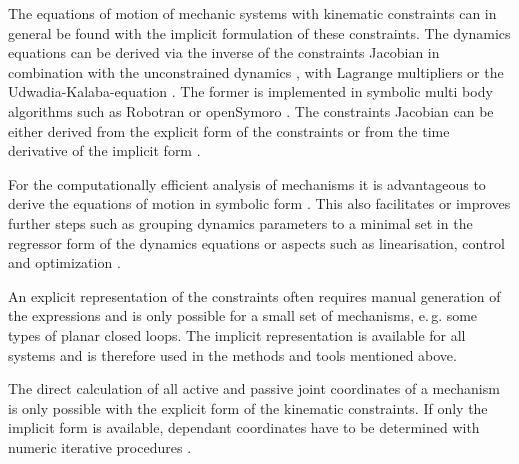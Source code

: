 \documentclass[twocolumn,10pt]{IFTOMM}
\begin{document}
The equations of motion of mechanic systems with kinematic constraints can in general be found with the implicit formulation of these constraints.
The dynamics equations can be derived via the inverse of the constraints Jacobian in combination with the unconstrained dynamics \cite{NakamuraGho1989}, with Lagrange multipliers \cite{LuhZhe1985} or the Udwadia-Kalaba-equation \cite{UdwadiaKal1992}.
The former is implemented in symbolic multi body algorithms such as Robotran \cite{SaminFis2013} or openSymoro \cite{KhalilVijKhoMuk2014}.
The constraints Jacobian can be either derived from the explicit form of the constraints \cite{NakamuraGho1989} or from the time derivative of the implicit form \cite{ParkChoPlo1999}.

For the computationally efficient analysis of mechanisms it is advantageous to derive the equations of motion in symbolic form \cite{SaminFis2013}.
This also facilitates or improves further steps such as grouping dynamics parameters to a minimal set  in the regressor form of the dynamics equations \cite{KhalilBen1995} or aspects such as linearisation, control and optimization \cite{ParkChoPlo1999}.


An explicit representation of the constraints often requires manual generation of the expressions and is only possible for a small set of mechanisms, e.\,g. some types of planar closed loops.
The implicit representation is available for all systems and is therefore used in the methods and tools mentioned above.


The direct calculation of all active and passive joint coordinates of a mechanism is only possible with the explicit form of the kinematic constraints.
If only the implicit form is available, dependant coordinates have to be determined with numeric iterative procedures \cite{ParkChoPlo1999}.
\end{document}
